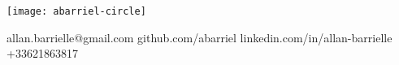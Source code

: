 \begin{minipage}{.22\linewidth}
    \texttt{[image: abarriel-circle]}
\end{minipage}
\begin{minipage}{.30\linewidth}
\end{minipage}
\begin{minipage}{.6\linewidth}
    \workitems    
    {allan.barrielle@gmail.com}
    {github.com/abarriel}
    {linkedin.com/in/allan-barrielle}
    {+33621863817}
\end{minipage}\hfill
